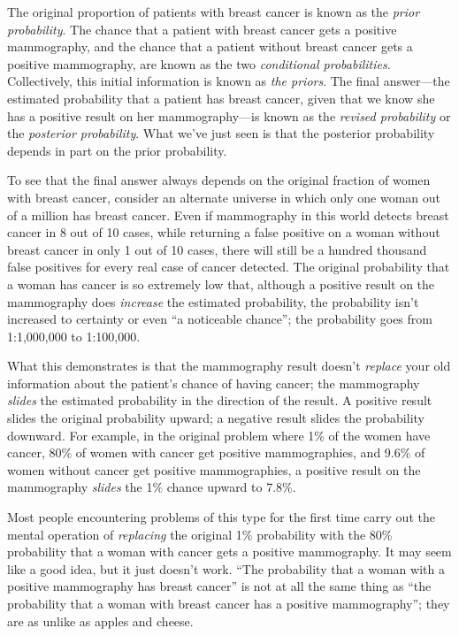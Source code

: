 {
 The original proportion of patients with breast cancer is known as
the \textit{prior probability}. The chance that a patient with breast
cancer gets a positive mammography, and the chance that a patient
without breast cancer gets a positive mammography, are known as the two
\textit{conditional probabilities}. Collectively, this initial
information is known as \textit{the priors}. The final answer---the
estimated probability that a patient has breast cancer, given that we
know she has a positive result on her mammography---is known as the
\textit{revised probability} or the \textit{posterior probability}.
What we've just seen is that the posterior probability
depends in part on the prior probability.}

{
 To see that the final answer always depends on the original
fraction of women with breast cancer, consider an alternate universe in
which only one woman out of a million has breast cancer. Even if
mammography in this world detects breast cancer in 8 out of 10 cases,
while returning a false positive on a woman without breast cancer in
only 1 out of 10 cases, there will still be a hundred thousand false
positives for every real case of cancer detected. The original
probability that a woman has cancer is so extremely low that, although
a positive result on the mammography does \textit{increase} the
estimated probability, the probability isn't increased
to certainty or even ``a noticeable
chance''; the probability goes from 1:1,000,000 to
1:100,000.}

{
 What this demonstrates is that the mammography result
doesn't \textit{replace} your old information about the
patient's chance of having cancer; the mammography
\textit{slides} the estimated probability in the direction of the
result. A positive result slides the original probability upward; a
negative result slides the probability downward. For example, in the
original problem where 1\% of the women have cancer, 80\% of women with
cancer get positive mammographies, and 9.6\% of women without cancer
get positive mammographies, a positive result on the mammography
\textit{slides} the 1\% chance upward to 7.8\%.}

{
 Most people encountering problems of this type for the first time
carry out the mental operation of \textit{replacing} the original 1\%
probability with the 80\% probability that a woman with cancer gets a
positive mammography. It may seem like a good idea, but it just
doesn't work. ``The probability that a
woman with a positive mammography has breast cancer''
is not at all the same thing as ``the probability that
a woman with breast cancer has a positive
mammography''; they are as unlike as apples and
cheese.}

